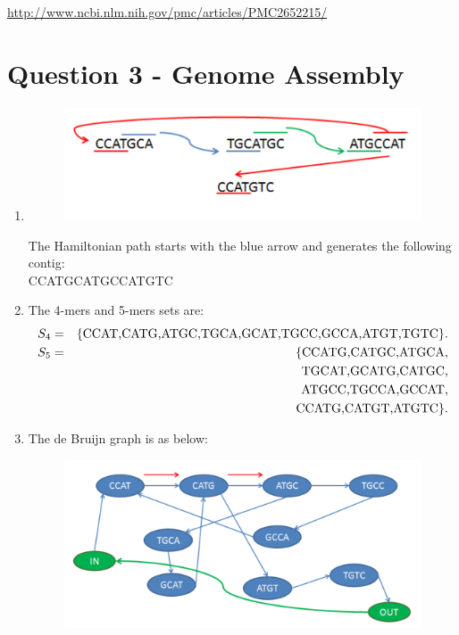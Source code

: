 \documentclass[a4paper,11pt]{article}
\begin{document}
\url{http://www.ncbi.nlm.nih.gov/pmc/articles/PMC2652215/}


\section*{Question 3 - Genome Assembly}

\begin{enumerate}

\item
\begin{figure}[h]
\centering\includegraphics[scale=.5]{Hamilton.pdf}
\end{figure}

The Hamiltonian path starts with the blue arrow and generates the
following contig:\\
CCATGCATGCCATGTC

\item 
The 4-mers and 5-mers sets are:
\begin{eqnarray*}
  S_4 &=& \{\mbox{CCAT,CATG,ATGC,TGCA,GCAT,TGCC,GCCA,ATGT,TGTC}\}.\\
  S_5&=&\{\mbox{CCATG,CATGC,ATGCA,} \\
  &&\phantom\{\mbox{TGCAT,GCATG,CATGC,} \\
  &&\phantom\{\mbox{ATGCC,TGCCA,GCCAT,} \\
  &&\phantom\{\mbox{CCATG,CATGT,ATGTC}\}.
\end{eqnarray*}


\item The de Bruijn graph is as below:
\begin{figure}[h]
\centering\includegraphics[scale=.5]{Brujin.pdf}
\end{figure}


\end{enumerate}
\end{document}
